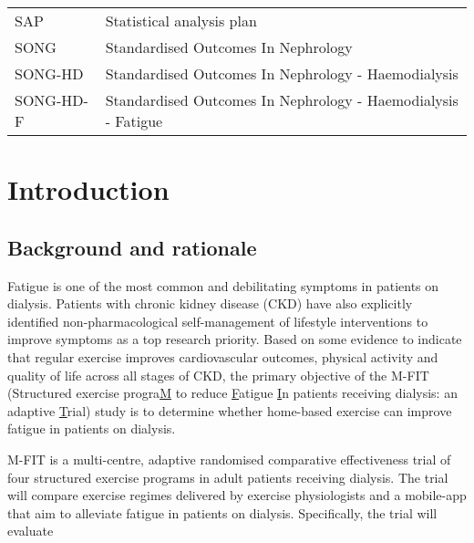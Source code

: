 \documentclass[
]{article}
\begin{document}
\begin{table}[H]
\begin{tabular}{p{}p{}}
    SAP           & Statistical analysis plan                                                                                        \\
    SONG          & Standardised Outcomes In Nephrology                                                                              \\
    SONG-HD       & Standardised Outcomes In Nephrology - Haemodialysis                                                              \\
    SONG-HD-F     & Standardised Outcomes In Nephrology - Haemodialysis - Fatigue                                                    \\
    \bottomrule
  \end{tabular}
\end{table}

\clearpage

\hypertarget{introduction}{%
  \section{Introduction}\label{Introduction}}


\hypertarget{background}{%
  \subsection{Background and rationale}\label{background}}

Fatigue is one of the most common and debilitating symptoms in patients on dialysis.
Patients with chronic kidney disease (CKD) have also explicitly identified non-pharmacological self-management of lifestyle interventions to improve symptoms as a top research priority.
Based on some evidence to indicate that regular exercise improves cardiovascular outcomes, physical activity and quality of life across all stages of CKD, the primary objective of the M-FIT (Structured exercise progra\underline{M} to reduce \underline{F}atigue \underline{I}n patients receiving dialysis: an adaptive \underline{T}rial) study is to determine whether home-based exercise can improve fatigue in patients on dialysis.

M-FIT is a multi-centre, adaptive randomised comparative effectiveness trial of four structured exercise programs in adult patients receiving dialysis.
The trial will compare exercise regimes delivered by exercise physiologists and a mobile-app that aim to alleviate fatigue in patients on dialysis.
Specifically, the trial will evaluate
\end{document}
